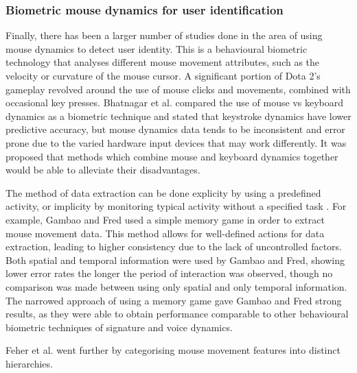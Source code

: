\documentclass[Report.tex]{subfiles}
\begin{document}
\subsubsection{Biometric mouse dynamics for user identification}
Finally, there has been a larger number of studies done in the area of using mouse dynamics to detect user identity. This is a behavioural biometric technology that analyses different mouse movement attributes, such as the velocity or curvature of the mouse cursor. A significant portion of Dota 2's gameplay revolved around the use of mouse clicks and movements, combined with occasional key presses. Bhatnagar et al. \cite{mouse-vs-keyboard} compared the use of mouse vs keyboard dynamics as a biometric technique and stated that keystroke dynamics have lower predictive accuracy, but mouse dynamics data tends to be inconsistent and error prone due to the varied hardware input devices that may work differently. It was proposed that methods which combine mouse and keyboard dynamics together would be able to alleviate their disadvantages.

The method of data extraction can be done explicity by using a predefined activity, or implicity by monitoring typical activity without a specified task \cite{mouse-dynamics}. For example, Gambao and Fred \cite{mouse-features} used a simple memory game in order to extract mouse movement data. This method allows for well-defined actions for data extraction, leading to higher consistency due to the lack of uncontrolled factors. Both spatial and temporal information were used by Gambao and Fred, showing lower error rates the longer the period of interaction was observed, though no comparison was made between using only spatial and only temporal information. The narrowed approach of using a memory game gave Gambao and Fred strong results, as they were able to obtain performance comparable to other behavioural biometric techniques of signature and voice dynamics. 


Feher et al. \cite{mouse-dynamics} went further by categorising mouse movement features into distinct hierarchies. 
\end{document}
